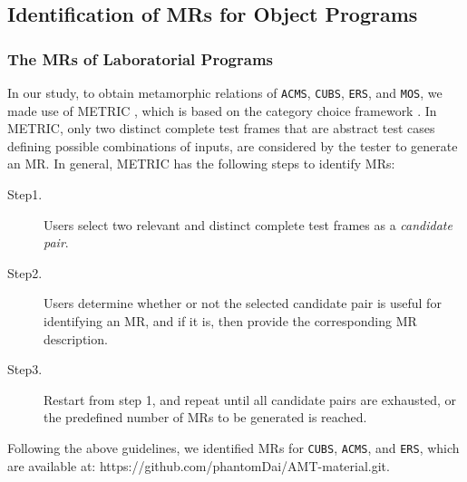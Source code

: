 \documentclass[10pt,journal,compsoc]{IEEEtran}
\begin{document}
\subsection{Identification of MRs for Object Programs}
\label{sec:MRs}

\subsubsection{The MRs of Laboratorial Programs}
\label{sec:MRsoflab}

In our study, to obtain metamorphic relations of \texttt{ACMS}, \texttt{CUBS}, \texttt{ERS}, and \texttt{MOS}, we made use of METRIC \cite{chen2016metric}, which is based on the category choice framework \cite{ostrand1988category}. In METRIC, only two distinct complete test frames that are abstract test cases defining possible combinations of inputs, are considered by the tester to generate an MR. In general, METRIC has the following steps to identify MRs:
\begin{description}
  \item [Step1.]
  Users select two relevant and distinct complete test frames as a \emph{candidate pair}.
  \item [Step2.]
  Users determine whether or not the selected candidate pair is useful for identifying an MR, and if it is, then provide the corresponding MR description.
  \item [Step3.]
  Restart from step 1, and repeat until all candidate pairs are exhausted, or the predefined number of MRs to be generated is reached.
\end{description}

Following the above guidelines, we identified MRs for \texttt{CUBS}, \texttt{ACMS}, and \texttt{ERS}, which are available at: https://github.com/phantomDai/AMT-material.git. 
\end{document}
